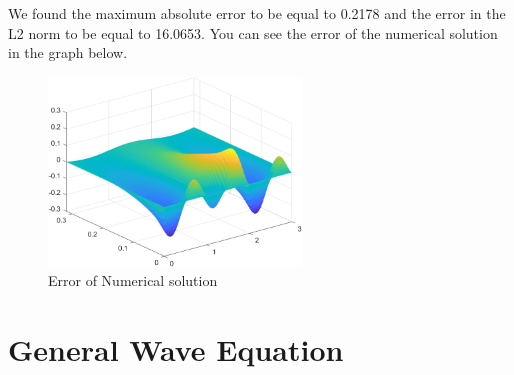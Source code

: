 \documentclass{article}
\begin{document}
We found the maximum absolute error to be equal to 0.2178 and the error in the L2 norm to be equal to 16.0653. You can see the error of the numerical solution in the graph below. 

\begin{figure}[H]
    \centering
    \includegraphics[width=0.6\textwidth]{Error.png}
    \caption{Error of Numerical solution}
\end{figure}


\section{General Wave Equation}
\end{document}
